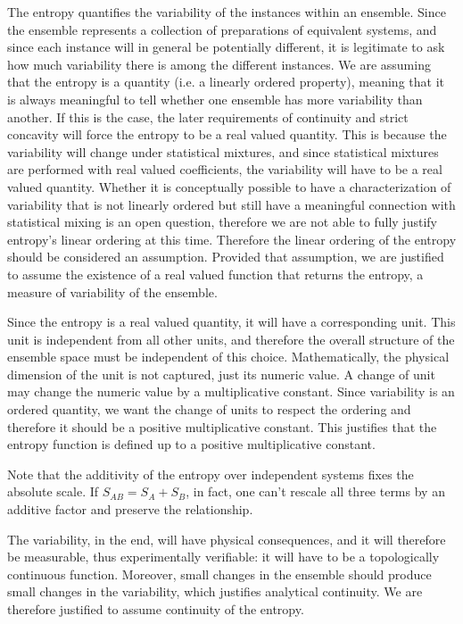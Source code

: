 \documentclass[10pt,twocolumn, nofootinbib]{revtex4-2}
\begin{document}
\begin{justification}
	The entropy quantifies the variability of the instances within an ensemble. Since the ensemble represents a collection of preparations of equivalent systems, and since each instance will in general be potentially different, it is legitimate to ask how much variability there is among the different instances. We are assuming that the entropy is a quantity (i.e. a linearly ordered property), meaning that it is always meaningful to tell whether one ensemble has more variability than another. If this is the case, the later requirements of continuity and strict concavity will force the entropy to be a real valued quantity. This is because the variability will change under statistical mixtures, and since statistical mixtures are performed with real valued coefficients, the variability will have to be a real valued quantity. Whether it is conceptually possible to have a characterization of variability that is not linearly ordered but still have a meaningful connection with statistical mixing is an open question, therefore we are not able to fully justify entropy's linear ordering at this time. Therefore the linear ordering of the entropy should be considered an assumption. Provided that assumption, we are justified to assume the existence of a real valued function that returns the entropy, a measure of variability of the ensemble.
	
	Since the entropy is a real valued quantity, it will have a corresponding unit. This unit is independent from all other units, and therefore the overall structure of the ensemble space must be independent of this choice. Mathematically, the physical dimension of the unit is not captured, just its numeric value. A change of unit may change the numeric value by a multiplicative constant. Since variability is an ordered quantity, we want the change of units to respect the ordering and therefore it should be a positive multiplicative constant. This justifies that the entropy function is defined up to a positive multiplicative constant.
	
	Note that the additivity of the entropy over independent systems fixes the absolute scale. If $S_{AB} = S_A + S_B$, in fact, one can't rescale all three terms by an additive factor and preserve the relationship.
	
	The variability, in the end, will have physical consequences, and it will therefore be measurable, thus experimentally verifiable: it will have to be a topologically continuous function. Moreover, small changes in the ensemble should produce small changes in the variability, which justifies analytical continuity. We are therefore justified to assume continuity of the entropy.
	

\end{justification}
\end{document}
